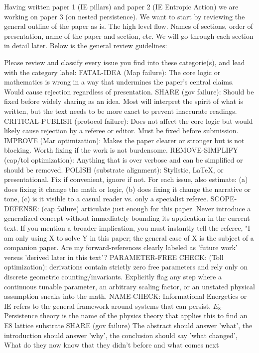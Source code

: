 Having written paper 1 (IE pillars) and paper 2 (IE Entropic Action) we are working on paper 3 (on nested persistence).  We want to start by reviewing the general outline of the paper as is.  The high level flow.  Names of sections, order of presentation, name of the paper and section, etc.  We will go through each section in detail later.  Below is the general review guidelines:

Please review and classify every issue you find into these categorie(s), and lead with the category label:
FATAL-IDEA (Map failure): The core logic or mathematics is wrong in a way that undermines the paper's central claims. Would cause rejection regardless of presentation.
SHARE (gov failure): Should be fixed before widely sharing as an idea.  Most will interpret the spirit of what is written, but the text needs to be more exact to prevent inaccurate readings.
CRITICAL-PUBLISH (protocol failure): Does not affect the core logic but would likely cause rejection by a referee or editor. Must be fixed before submission.
IMPROVE (Mar optimization): Makes the paper clearer or stronger but is not blocking. Worth fixing if the work is not burdensome.
REMOVE-SIMPLIFY (cap/tol optimization): Anything that is over verbose and can be simplified or should be removed.
POLISH (substrate alignment): Stylistic, LaTeX, or presentational. Fix if convenient, ignore if not.
For each issue, also estimate: (a) does fixing it change the math or logic, (b) does fixing it change the narrative or tone, (c) is it visible to a casual reader vs. only a specialist referee.
SCOPE-DEFENSE: (cap failure) articulate just enough for this paper.  Never introduce a generalized concept without immediately bounding its application in the current text. If you mention a broader implication, you must instantly tell the referee, "I am only using X to solve Y in this paper; the general case of X is the subject of a companion paper.  Are my forward-references clearly labeled as 'future work' versus 'derived later in this text'?
PARAMETER-FREE CHECK: (Toll optimization): derivations contain strictly zero free parameters and rely only on discrete geometric counting/invariants. Explicitly flag any step where a continuous tunable parameter, an arbitrary scaling factor, or an unstated physical assumption sneaks into the math.
NAME-CHECK: Informational Energetics or IE refers to the general framework around systems that can persist.  $E_8$-Persistence theory is the name of the physics theory that applies this to find an E8 lattice substrate
SHARE (gov failure) The abstract should answer 'what', the introduction should answer 'why', the conclusion should say 'what changed', What do they now know that they didn't before and what comes next 

